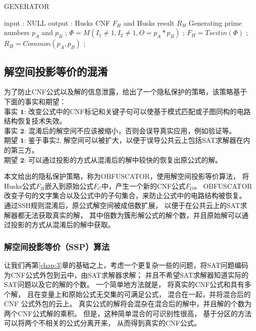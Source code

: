 \begin{algorithm*}[b]
\caption{GENERATOR}
\label{4:algo2_gen}
\begin{algorithmic}[1]
\STATE input : NULL
\STATE output : Husks CNF $F_H$ and Husks result $R_H$
\STATE Generating prime numbers $p_A$ and $p_B$  ; \label{4:primenumber}
\STATE $\Phi= M(I_1 \neq 1, I_2\neq 1, O=p_A*p_B)$ ;\label{4:multiplePrime}
\STATE $F_H=Tseitin(\Phi)$ ;\label{4:TseitinPHI}
\STATE $R_H=Common(p_A,p_B)$ ;
\end{algorithmic}
\end{algorithm*}

\subsection{解空间投影等价的混淆}\label{4:obfuscating}

为了防止CNF公式以及解的信息泄露，给出了一个隐私保护的策略，该策略基于下面的事实和期望：
\\$\textbf{事实 1:}$ 改变公式中的CNF标记和关键子句可以使基于模式匹配或子图同构的电路结构恢复技术失效。
\\$\textbf{事实 2:}$ 混淆后的解空间不应该被缩小，否则会误导真实应用，例如验证等。
\\$\textbf{期望 1:}$ 鉴于事实2, 解空间可以被扩大，以便于误导公共云上包括SAT求解器在内的第三方。
\\$\textbf{期望 2:}$ 可以通过投影的方式从混淆后的解中较快的恢复出原公式的解。

本文给出的隐私保护策略，称为OBFUSCATOR，使用解空间投影等价算法，
将Husks公式$F_H$嵌入到原始公式$F_C$中，产生一个新的CNF公式$F_O$。
OBFUSCATOR改变子句的文字集合以及公式中的子句集合，来防止公式中的电路结构被恢复。
通过SSH规则混淆后，原公式解空间被成倍数扩展，
以便于在公共云上的SAT求解器都无法获取真实的解，
其中倍数为簇形解公式的解个数，并且原始解可以通过投影的方式从混淆后的解中获取。

\subsubsection{解空间投影等价（SSP）算法}\label{4:embeded rules}

让我们再第\ref{chap:3}章的基础之上，考虑一个更复杂一些的问题，将SAT问题编码为CNF公式外包到云中，由SAT求解器求解；
并且不希望SAT求解器知道实际的SAT问题以及它的解的个数。
一个简单地方法就是，
将真实的CNF公式和具有多个解，
且在变量上和原始公式无交集的可满足公式，
混合在一起，并将混合后的CNF 公式外包的云上。
真实公式的解将会混杂在混合后的解中，并且解的个数为两个CNF公式解的乘积。
但是，这种简单混合的可识别性很高，
基于分区的方法可以将两个不相关的公式分离开来，
从而得到真实的CNF公式。

